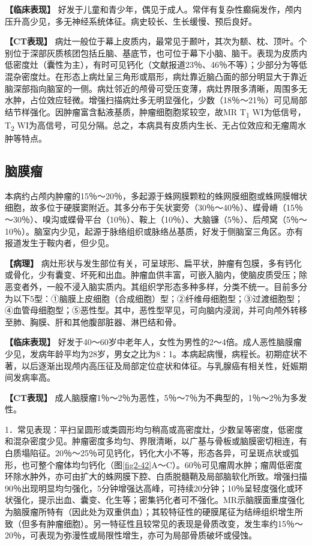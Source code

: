 \textbf{【临床表现】}
好发于儿童和青少年，偶见于成人。常伴有复杂性癫痫发作，颅内压升高少见，多无神经系统体征。病史较长、生长缓慢、预后良好。

\textbf{【CT表现】}
病灶一般位于幕上皮质内，最常见于颞叶，其次为额、枕、顶叶。个别位于深部灰质核团包括丘脑、基底节，也可位于幕下小脑、脑干。表现为皮质内低密度灶（囊性为主），有时可见钙化（文献报道23％、46％不等）；少部分为等低混杂密度灶。在形态上病灶呈三角形或扇形，病灶靠近脑凸面的部分明显大于靠近脑深部指向脑室的一侧。病灶邻近的颅骨可受压变薄，病灶界限多清晰，周围多无水肿，占位效应轻微。增强扫描病灶多无明显强化，少数（18％～21％）可见局部结节样强化。因肿瘤富含黏液基质，肿瘤细胞胞浆较空，故MR
T\textsubscript{1} WI为低信号，T\textsubscript{2}
WI为高信号，可见分隔。总之，本病具有皮质内生长、无占位效应和无瘤周水肿等特点。

\subsection{脑膜瘤}

本病约占颅内肿瘤的15％～20％，多起源于蛛网膜颗粒的蛛网膜细胞或蛛网膜帽状细胞，故多位于硬膜窦附近。其多分布于矢状窦旁（30％～40％）、蝶骨嵴（15％～30％）、嗅沟或蝶骨平台（10％）、鞍上（10％）、大脑镰（5％）、后颅窝（5％～10％）。脑室内少见，起源于脉络组织或脉络丛基质，好发于侧脑室三角区。亦有报道发生于鞍内者，但少见。

\textbf{【病理】}
病灶形状与发生部位有关，可呈球形、扁平状，肿瘤有包膜，多有钙化或骨化，少有囊变、坏死和出血。肿瘤血供丰富，可嵌入脑内，使脑皮质受压；除恶变者外，一般不浸入脑实质内。其组织学形态多种多样，分类不统一。目前多分为以下5型：①脑膜上皮细胞（合成细胞）型；②纤维母细胞型；③过渡细胞型；④血管母细胞型；⑤恶性型。其中，恶性型罕见，可向脑内浸润，并可向颅外转移至肺、胸膜、肝和其他腹部脏器、淋巴结和骨。

\textbf{【临床表现】}
好发于40～60岁中老年人，女性为男性的2～4倍。成人恶性脑膜瘤少见，发病年龄平均为28岁，男女之比为8∶1。本病起病慢，病程长。初期症状不著，以后逐渐出现颅内高压征及局部定位症状和体征。与乳腺癌有相关性，妊娠期间发病率高。

\textbf{【CT表现】}
成人脑膜瘤1％～2％为恶性，5％～7％为不典型的，1％～2％为多发性。

1．常见表现：平扫呈圆形或类圆形均匀稍高或高密度灶，少数呈等密度，低密度和混杂密度少见。肿瘤密度多均匀、界限清晰，以广基与骨板或脑膜密切相连，有白质塌陷征。20％～25％可见钙化，钙化大小不等，形态各异，可呈斑点状或弧形，也可整个瘤体均匀钙化（图\ref{fig2-42}A～C）。60％可见瘤周水肿；瘤周低密度环除水肿外，亦可由扩大的蛛网膜下腔、白质脱髓鞘及局部脑软化所致。增强扫描90％出现明显均匀强化，5分钟增强达高峰，可持续20分钟；10％呈轻度强化或环状强化，提示出血、囊变、化生等；密集钙化者可不强化。MR示脑膜面重度强化为脑膜瘤所特有（因此处为双重供血）；其较特征性的硬膜尾征为结缔组织增生所致（但多有肿瘤细胞）。另一特征性且较常见的表现是骨质改变，发生率约15％～20％，可表现为弥漫性或局限性增生，亦可为局部骨质破坏或侵蚀。




